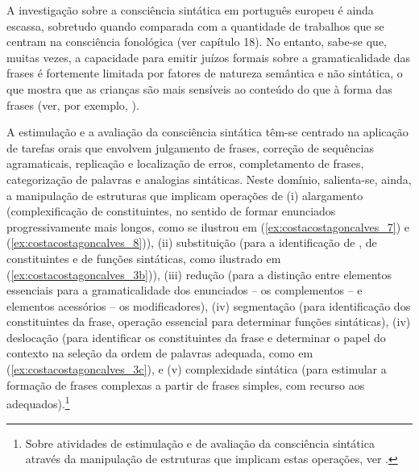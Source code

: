 \documentclass[output=paper]{LSP/langsci}
\begin{document}
A investigação sobre a consciência sintática em português europeu é ainda escassa, sobretudo quando comparada com a quantidade de trabalhos que se centram na consciência fonológica (ver capítulo 18). No entanto, sabe-se que, muitas vezes, a capacidade para emitir juízos formais sobre a gramaticalidade das frases é fortemente limitada por fatores de natureza semântica e não sintática, o que mostra que as crianças são mais sensíveis ao conteúdo do que à forma das frases (ver, por exemplo, \citealt{gombert1992,simsim1998}).

A estimulação e a avaliação da consciência sintática têm-se centrado na aplicação de tarefas orais que envolvem julgamento de frases, correção de sequências agramaticais, replicação e localização de erros, completamento de frases, categorização de palavras e analogias sintáticas. Neste domínio, salienta-se, ainda, a manipulação de estruturas que implicam operações de (i) alargamento (complexificação de constituintes, no sentido de formar enunciados progressivamente mais longos, como se ilustrou em (\ref{ex:costacostagoncalves_7}) e (\ref{ex:costacostagoncalves_8})), (ii) substituição (para a identificação de , de constituintes e de funções sintáticas, como ilustrado em (\ref{ex:costacostagoncalves_3b})), (iii) redução (para a distinção entre elementos essenciais para a gramaticalidade dos enunciados – os complementos – e elementos acessórios – os modificadores), (iv) segmentação (para identificação dos constituintes da frase, operação essencial para determinar funções sintáticas), (iv) deslocação (para identificar os constituintes da frase e determinar o papel do contexto na seleção da ordem de palavras adequada, como em (\ref{ex:costacostagoncalves_3c}), e (v) complexidade sintática (para estimular a formação de frases complexas a partir de frases simples, com recurso aos  adequados).\footnote{Sobre atividades de estimulação e de avaliação da consciência sintática através da manipulação de estruturas que implicam estas operações, ver \citet{duarte2008}.}
\end{document}
